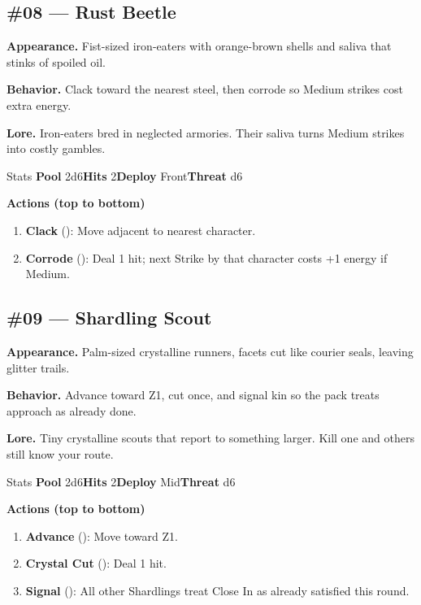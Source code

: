 \subsection*{\#08 --- Rust Beetle}

\textbf{Appearance.} Fist-sized iron-eaters with orange-brown shells and saliva that stinks of spoiled oil.

\textbf{Behavior.} Clack toward the nearest steel, then corrode so Medium strikes cost extra energy.

\textbf{Lore.} Iron-eaters bred in neglected armories. Their saliva turns Medium strikes into costly gambles.

\begin{monsterentry}{Stats}
\textbf{Pool} 2d6\quad\textbf{Hits} 2\quad\textbf{Deploy} Front\quad\textbf{Threat} d6

\textbf{Actions (top to bottom)}
\begin{enumerate}\setlength{\itemsep}{0.15em}\setlength{\parskip}{0pt}
  \item \textbf{Clack} (\easy): Move adjacent to nearest character.
  \item \textbf{Corrode} (\medium): Deal 1 hit; next Strike by that character costs +1 energy if Medium.
\end{enumerate}
\end{monsterentry}

\subsection*{\#09 --- Shardling Scout}

\textbf{Appearance.} Palm-sized crystalline runners, facets cut like courier seals, leaving glitter trails.

\textbf{Behavior.} Advance toward Z1, cut once, and signal kin so the pack treats approach as already done.

\textbf{Lore.} Tiny crystalline scouts that report to something larger. Kill one and others still know your route.

\begin{monsterentry}{Stats}
\textbf{Pool} 2d6\quad\textbf{Hits} 2\quad\textbf{Deploy} Mid\quad\textbf{Threat} d6

\textbf{Actions (top to bottom)}
\begin{enumerate}\setlength{\itemsep}{0.15em}\setlength{\parskip}{0pt}
  \item \textbf{Advance} (\easy): Move toward Z1.
  \item \textbf{Crystal Cut} (\medium): Deal 1 hit.
  \item \textbf{Signal} (\hard): All other Shardlings treat Close In as already satisfied this round.
\end{enumerate}
\end{monsterentry}

